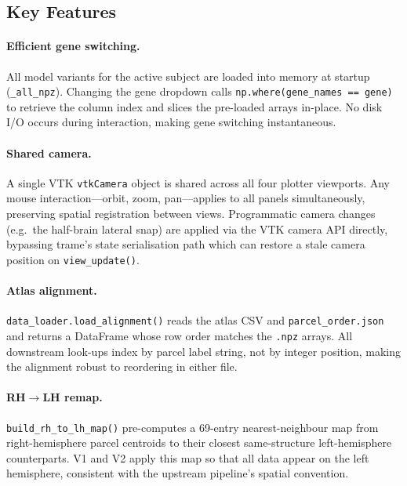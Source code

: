 \documentclass[11pt,letterpaper]{article}
\begin{document}
\subsection{Key Features}

\paragraph{Efficient gene switching.}
All model variants for the active subject are loaded into memory at
startup (\texttt{\_all\_npz}).
Changing the gene dropdown calls \texttt{np.where(gene\_names == gene)}
to retrieve the column index and slices the pre-loaded arrays in-place.
No disk I/O occurs during interaction, making gene switching instantaneous.

\paragraph{Shared camera.}
A single VTK \texttt{vtkCamera} object is shared across all four
plotter viewports.
Any mouse interaction—orbit, zoom, pan—applies to all panels
simultaneously, preserving spatial registration between views.
Programmatic camera changes (e.g.\ the half-brain lateral snap) are
applied via the VTK camera API directly, bypassing trame's state
serialisation path which can restore a stale camera position on
\texttt{view\_update()}.

\paragraph{Atlas alignment.}
\texttt{data\_loader.load\_alignment()} reads the atlas CSV and
\texttt{parcel\_order.json} and returns a DataFrame whose row order
matches the \texttt{.npz} arrays.
All downstream look-ups index by parcel label string, not by integer
position, making the alignment robust to reordering in either file.

\paragraph{RH$\to$LH remap.}
\texttt{build\_rh\_to\_lh\_map()} pre-computes a 69-entry
nearest-neighbour map from right-hemisphere parcel centroids to
their closest same-structure left-hemisphere counterparts.
V1 and V2 apply this map so that all data appear on the left
hemisphere, consistent with the upstream pipeline's spatial convention.

\end{document}
